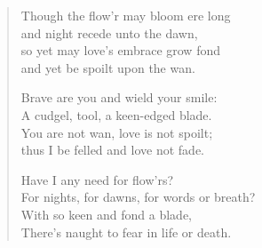 \begin{verse}
  Though the flow'r may bloom ere long\\
  and night recede unto the dawn,\\
  so yet may love’s embrace grow fond\\
  and yet be spoilt upon the wan.

  Brave are you and wield your smile:\\
  A cudgel, tool, a keen-edged blade.\\
  You are not wan, love is not spoilt;\\
  thus I be felled and love not fade.

  Have I any need for flow'rs?\\
  For nights, for dawns, for words or breath?\\
  With so keen and fond a blade,\\
  There's naught to fear in life or death.
\end{verse}
